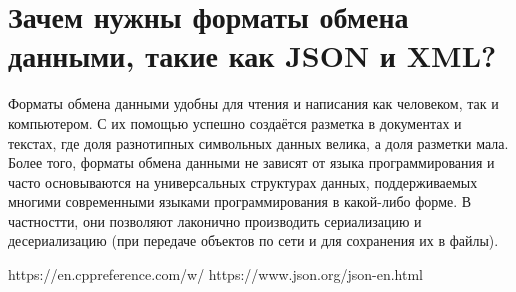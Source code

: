 \documentclass[a4paper,12pt]{article}	%
\begin{document}
\section{Зачем нужны форматы обмена данными, такие как JSON и XML?}

	Форматы обмена данными удобны для чтения и написания как человеком, так и компьютером. С их помощью успешно создаётся разметка в документах и текстах, где доля разнотипных символьных данных велика, а доля разметки мала. Более того, форматы обмена данными не зависят от языка программирования и часто основываются на универсальных структурах данных, поддерживаемых многими современными языками программирования в какой-либо форме. В частностти, они позволяют лаконично производить сериализацию и десериализацию (при передаче объектов по сети и для сохранения их в файлы).

			
\newpage

	
 
	\begin{thebibliography}{}
	
		 https://en.cppreference.com/w/
		 https://www.json.org/json-en.html
		
	\end{thebibliography}
\end{document}
